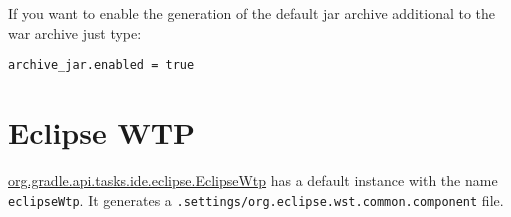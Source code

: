 \noindent If you want to enable the generation of the default jar archive additional to the war archive just type:
\begin{Verbatim}
archive_jar.enabled = true
\end{Verbatim}
\section{Eclipse WTP} %
\label{sec:eclipse_wtp}
\href{\API tasks/ide/eclipse/EclipseWtp.html}{org.gradle.api.tasks.ide.eclipse.EclipseWtp} has a default instance with the name \texttt{eclipseWtp}. It generates a \texttt{.settings/org.eclipse.wst.common.component} file.
